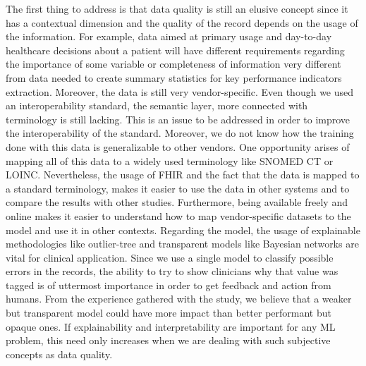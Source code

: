 The first thing to address is that data quality is still an elusive concept since it has a contextual dimension and the quality of the record depends on the usage of the information. For example, data aimed at primary usage and day-to-day healthcare decisions about a patient will have different requirements regarding the importance of some variable or completeness of information very different from data needed to create summary statistics for key performance indicators extraction. 
Moreover, the data is still very vendor-specific. Even though we used an interoperability standard, the semantic layer, more connected with terminology is still lacking. This is an issue to be addressed in order to improve the interoperability of the standard. Moreover, we do not know how the training done with this data is generalizable to other vendors. One opportunity arises of mapping all of this data to a widely used terminology like SNOMED CT or LOINC. Nevertheless, the usage of FHIR and the fact that the data is mapped to a standard terminology, makes it easier to use the data in other systems and to compare the results with other studies. Furthermore, being available freely and online makes it easier to understand how to map vendor-specific datasets to the model and use it in other contexts.
Regarding the model, the usage of explainable methodologies like outlier-tree and transparent models like Bayesian networks are vital for clinical application. Since we use a single model to classify possible errors in the records, the ability to try to show clinicians why that value was tagged is of uttermost importance in order to get feedback and action from humans. From the experience gathered with the study, we believe that a weaker but transparent model could have more impact than better performant but opaque ones. If explainability and interpretability are important for any ML problem, this need only increases when we are dealing with such subjective concepts as data quality.



